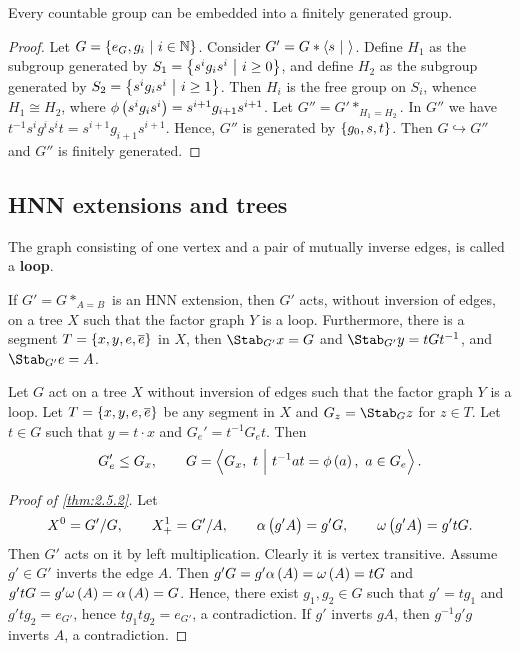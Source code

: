 \begin{lemma}
Every countable group can be embedded into a finitely generated group.
\end{lemma}

\begin{proof}
Let $ G = \cbr{e_G, g_i \st i \in \NN} $. Consider $ G' = G * \left\langle s \ \middle| \  \right\rangle $. Define $ H_1 $ as the subgroup generated by $ S_1 = \cbr{s^ig_is^i \st i \ge 0} $, and define $ H_2 $ as the subgroup generated by $ S_2 = \cbr{s^ig_is^i \st i \ge 1} $. Then $ H_i $ is the free group on $ S_i $, whence $ H_1 \cong H_2 $, where $ \phi\br{s^ig_is^i} = s^{i + 1}g_{i + 1}s^{i + 1} $. Let $ G'' = G' *_{H_1 = H_2} $. In $ G'' $ we have $ t^{-1}s^ig^is^it = s^{i + 1}g_{i + 1}s^{i + 1} $. Hence, $ G'' $ is generated by $ \cbr{g_0, s, t} $. Then $ G \hookrightarrow G'' $ and $ G'' $ is finitely generated.
\end{proof}

\subsection{HNN extensions and trees}

\begin{definition}
The graph consisting of one vertex and a pair of mutually inverse edges, is called a \textbf{loop}.
\end{definition}

\begin{theorem}
\label{thm:2.5.2}
If $ G' = G *_{A = B} $ is an HNN extension, then $ G' $ acts, without inversion of edges, on a tree $ X $ such that the factor graph $ Y $ is a loop. Furthermore, there is a segment $ T = \cbr{x, y, e, \overline{e}} $ in $ X $, then $ \Stab_{G'} x = G $ and $ \Stab_{G'} y = tGt^{-1} $, and $ \Stab_{G'} e = A $.
\end{theorem}

\begin{theorem}
Let $ G $ act on a tree $ X $ without inversion of edges such that the factor graph $ Y $ is a loop. Let $ T = \cbr{x, y, e, \overline{e}} $ be any segment in $ X $ and $ G_z = \Stab_G z $ for $ z \in T $. Let $ t \in G $ such that $ y = t \cdot x $ and $ G_e' = t^{-1}G_et $. Then
$$ G_e' \le G_x, \qquad G = \abr{G_x, \ t \st t^{-1}at = \phi\br{a}, \ a \in G_e}. $$
\end{theorem}

\begin{proof}[Proof of \ref{thm:2.5.2}]
Let
$$ X^0 = G' / G, \qquad X_+^1 = G' / A, \qquad \alpha\br{g'A} = g'G, \qquad \omega\br{g'A} = g'tG. $$
Then $ G' $ acts on it by left multiplication. Clearly it is vertex transitive. Assume $ g' \in G'  $ inverts the edge $ A $. Then $ g'G = g'\alpha\br{A} = \omega\br{A} = tG $ and $ g'tG = g'\omega\br{A} = \alpha\br{A} = G $. Hence, there exist $ g_1, g_2 \in G $ such that $ g' = tg_1 $ and $ g'tg_2 = e_{G'} $, hence $ tg_1tg_2 = e_{G'} $, a contradiction. If $ g' $ inverts $ gA $, then $ g^{-1}g'g $ inverts $ A $, a contradiction.
\end{proof}


